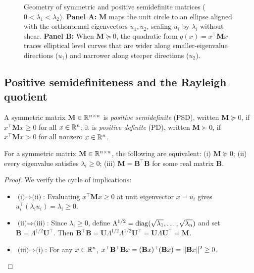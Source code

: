 \begin{figure}[htbp]
\caption{Geometry of symmetric and positive semidefinite matrices ($0 < \lambda_1 < \lambda_2$). \textbf{Panel A:} $\mathbf{M}$ maps the unit circle to an ellipse aligned with the orthonormal eigenvectors $u_1, u_2$, scaling $u_i$ by $\lambda_i$ without shear. \textbf{Panel B:} When $\mathbf{M} \succeq 0$, the quadratic form $q(x) = x^\top \mathbf{M} x$ traces elliptical level curves that are wider along smaller-eigenvalue directions ($u_1$) and narrower along steeper directions ($u_2$).}
\label{ch42:fig-spectral-geometry}
\end{figure}

\subsection{Positive semidefiniteness and the Rayleigh quotient}

\begin{definition}
\label{ch42:def-psd}
A symmetric matrix $\mathbf{M} \in \mathbb{R}^{n\times n}$ is \emph{positive semidefinite} (PSD), written $\mathbf{M} \succeq 0$, if $x^\top\mathbf{M}x \ge 0$ for all $x \in \mathbb{R}^n$; it is \emph{positive definite} (PD), written $\mathbf{M} \succ 0$, if $x^\top\mathbf{M}x > 0$ for all nonzero $x \in \mathbb{R}^n$.
\end{definition}

\begin{proposition}
\label{ch42:prop-psd}
For a symmetric matrix $\mathbf{M} \in \mathbb{R}^{n\times n}$, the following are equivalent: (i) $\mathbf{M} \succeq 0$; (ii) every eigenvalue satisfies $\lambda_i \ge 0$; (iii) $\mathbf{M} = \mathbf{B}^\top\mathbf{B}$ for some real matrix $\mathbf{B}$.
\end{proposition}

\begin{proof}
We verify the cycle of implications:
\begin{itemize}
\item $\text{(i)} \Rightarrow \text{(ii)}$: Evaluating $x^\top\mathbf{M}x \ge 0$ at unit eigenvector $x = u_i$ gives $u_i^\top(\lambda_i u_i) = \lambda_i \ge 0$.
\item $\text{(ii)} \Rightarrow \text{(iii)}$: Since $\lambda_i \ge 0$, define $\Lambda^{1/2} = \operatorname{diag}(\sqrt{\lambda_1},\dots,\sqrt{\lambda_n})$ and set $\mathbf{B} = \Lambda^{1/2}\mathbf{U}^\top$. Then $\mathbf{B}^\top\mathbf{B} = \mathbf{U}\Lambda^{1/2}\Lambda^{1/2}\mathbf{U}^\top = \mathbf{U}\Lambda\mathbf{U}^\top = \mathbf{M}$.
\item $\text{(iii)} \Rightarrow \text{(i)}$: For any $x \in \mathbb{R}^n$, $x^\top\mathbf{B}^\top\mathbf{B}x = (\mathbf{B}x)^\top(\mathbf{B}x) = \lVert\mathbf{B}x\rVert^2 \ge 0$. \qedhere
\end{itemize}
\end{proof}


